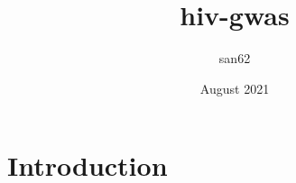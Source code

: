 \documentclass{article}
\title{hiv-gwas}
\author{san62 }
\date{August 2021}
\begin{document}
\maketitle

\section{Introduction}
\end{document}
